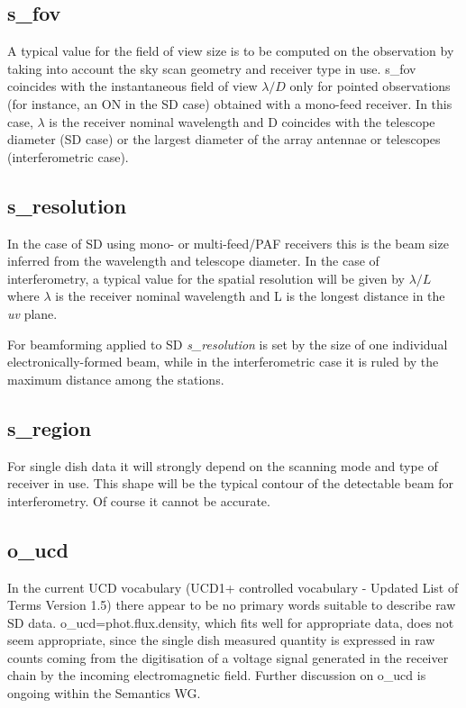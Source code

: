 \documentclass[11pt,a4paper]{ivoa}
\begin{document}
\subsection{s\_fov}
\label{sec:fov}

A typical value for the field of view size is to be computed on the observation by taking into account the sky scan geometry and receiver type in use.
s\_fov coincides with the instantaneous field of view $\lambda / D$ only for pointed observations (for instance, an ON in the SD case) obtained with a mono-feed receiver. In this case, $\lambda$ is the
receiver nominal wavelength and D coincides with the telescope diameter (SD case) or the largest diameter of the array antennae or telescopes (interferometric case).



\subsection{s\_resolution}
\label{sec:res}
In the case of SD using mono- or multi-feed/PAF receivers this is the beam size inferred from the wavelength and telescope diameter.
In the case of interferometry, a typical value for the spatial resolution will be given by $\lambda / L$ where $\lambda$
is the %
receiver nominal wavelength and L is the longest distance in the \emph{uv} plane.

For beamforming applied to SD \emph{s\_resolution} is set by the size of one individual electronically-formed beam, while in the interferometric
case it is ruled by the maximum distance among the stations.
 
 
\subsection{s\_region}
For single dish data it will strongly depend on the scanning mode and type of receiver in use.
This shape will be the typical contour of the detectable beam for interferometry. Of course it cannot be accurate.

\subsection{o\_ucd}

In the current UCD vocabulary (UCD1+ controlled vocabulary - Updated List of Terms Version 1.5) there appear to be no primary words suitable to describe raw SD data. o\_ucd=phot.flux.density, which fits well for appropriate data, does not seem appropriate, since the single dish measured quantity is expressed in raw counts coming from the digitisation of a voltage signal generated in the receiver chain by the incoming electromagnetic field. Further discussion on o\_ucd is ongoing within the Semantics WG.
\end{document}
